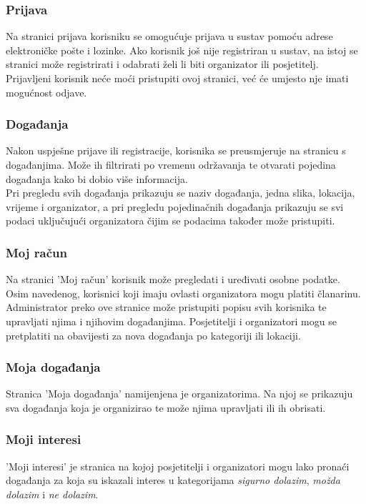 				\subsubsection{Prijava}
				 Na stranici prijava korisniku se omogućuje prijava u sustav pomoću adrese elektroničke pošte i lozinke. Ako korisnik još nije registriran u sustav, na istoj se stranici može registrirati i odabrati želi li biti organizator ili posjetitelj. Prijavljeni korisnik neće moći pristupiti ovoj stranici, već će umjesto nje imati mogućnost odjave.
				 
				\subsubsection{Događanja}
				Nakon uspješne prijave ili registracije, korisnika se preusmjeruje na stranicu s događanjima. Može ih filtrirati po vremenu održavanja te otvarati pojedina događanja kako bi dobio više informacija.\\
				Pri pregledu svih događanja prikazuju se naziv događanja, jedna slika, lokacija, vrijeme i organizator, a pri pregledu pojedinačnih događanja prikazuju se svi podaci uključujući organizatora čijim se podacima također može pristupiti.
				
				\subsubsection{Moj račun}
				Na stranici 'Moj račun' korisnik može pregledati i uređivati osobne podatke. Osim navedenog, korisnici koji imaju ovlasti organizatora mogu platiti članarinu. Administrator preko ove stranice može pristupiti popisu svih korisnika te upravljati njima i njihovim događanjima. Posjetitelji i organizatori mogu se pretplatiti na obavijesti za nova događanja po kategoriji ili lokaciji.
				
				\subsubsection{Moja događanja}
				Stranica 'Moja događanja' namijenjena je organizatorima. Na njoj se prikazuju sva događanja koja je organizirao te može njima upravljati ili ih obrisati.
				
				\subsubsection{Moji interesi}
				'Moji interesi' je stranica na kojoj posjetitelji i organizatori mogu lako pronaći događanja za koja su iskazali interes u kategorijama \textit{sigurno dolazim}, \textit{možda dolazim} i \textit{ne dolazim}.
				
